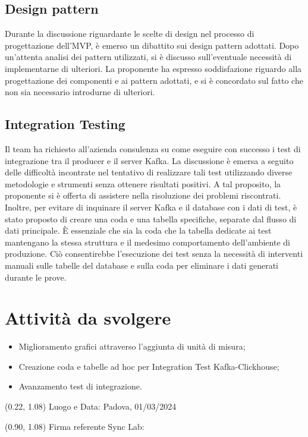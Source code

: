 \documentclass{article}
\begin{document}
    \subsection{Design pattern}
        Durante la discussione riguardante le scelte di design nel processo di progettazione dell'MVP, è emerso un dibattito sui design pattern adottati. Dopo un'attenta analisi dei pattern utilizzati, si è discusso sull'eventuale necessità di implementarne di ulteriori. La proponente ha espresso soddisfazione riguardo alla progettazione dei componenti e ai pattern adottati, e si è concordato sul fatto che non sia necessario introdurne di ulteriori.
    \subsection{Integration Testing}
        Il team ha richiesto all'azienda consulenza su come eseguire con successo i test di integrazione tra il producer e il server Kafka. La discussione è emersa a seguito delle difficoltà incontrate nel tentativo di realizzare tali test utilizzando diverse metodologie e strumenti senza ottenere risultati positivi. A tal proposito, la proponente si è offerta di assistere nella risoluzione dei problemi riscontrati. \\
        Inoltre, per evitare di inquinare il server Kafka e il database con i dati di test, è stato proposto di creare una coda e una tabella specifiche, separate dal flusso di dati principale. È essenziale che sia la coda che la tabella dedicate ai test mantengano la stessa struttura e il medesimo comportamento dell'ambiente di produzione. Ciò consentirebbe l'esecuzione dei test senza la necessità di interventi manuali sulle tabelle del database e sulla coda per eliminare i dati generati durante le prove.

\section{Attività da svolgere}
    \begin{itemize}
        \item Miglioramento grafici attraverso l'aggiunta di unità di misura;
        \item Creazione coda e tabelle ad hoc per Integration Test Kafka-Clickhouse;
        \item Avanzamento test di integrazione.
    \end{itemize}

\begin{textblock*}{\textwidth}(0.22\textwidth, 1.08\textheight)
    Luogo e Data: Padova, 01/03/2024
\end{textblock*}

\begin{textblock*}{\textwidth}(0.90\textwidth, 1.08\textheight)
        Firma referente Sync Lab:
\end{textblock*}
\end{document}
